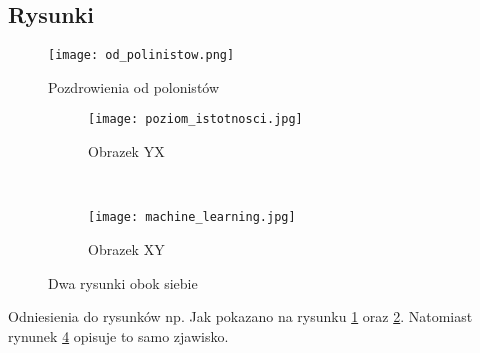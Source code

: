 \newpage
\subsection{Rysunki}

\begin{figure}[!ht]
	\centering 
	\texttt{[image: od\_polinistow.png]}
	\caption{Pozdrowienia od polonistów}\label{fig:polonistyka}
\end{figure}

\begin{figure}[!ht]
	\centering
	\begin{subfigure}[b]{0.45\textwidth}
		\centering
		\texttt{[image: poziom\_istotnosci.jpg]}
		\caption{Obrazek YX}\label{fig:obrazekA}
	\end{subfigure}
	~ %
	\begin{subfigure}[b]{0.45\textwidth}
		\centering
		\texttt{[image: machine\_learning.jpg]}
		\caption{Obrazek XY}\label{fig:obrazekB}
	\end{subfigure}
	\caption{Dwa rysunki obok siebie}\label{fig:Obrazki}
\end{figure}

Odniesienia do rysunków np. Jak pokazano na rysunku \ref{fig:polonistyka} oraz \ref{fig:obrazekA}.
Natomiast rynunek \ref{fig:Obrazki} opisuje to samo zjawisko.



